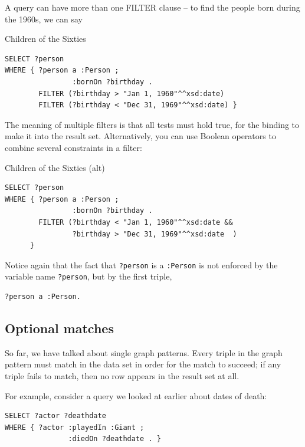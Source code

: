 A query can have more than one FILTER clause -- to find the people born
during the 1960s, we can say

\begin{query}Children of the Sixties\end{query}
\begin{lstlisting}
SELECT ?person
WHERE { ?person a :Person ;
                :bornOn ?birthday .
        FILTER (?birthday > "Jan 1, 1960"^^xsd:date)
        FILTER (?birthday < "Dec 31, 1969"^^xsd:date) }
\end{lstlisting}


The meaning of multiple filters is that all tests must hold true, for
the binding to make it into the result set. Alternatively, you can use
Boolean operators to combine several constraints in a filter:

\begin{query}Children of the Sixties (alt)\end{query}
\begin{lstlisting}
SELECT ?person
WHERE { ?person a :Person ;
                :bornOn ?birthday .
        FILTER (?birthday < "Jan 1, 1960"^^xsd:date &&
                ?birthday > "Dec 31, 1969"^^xsd:date  )
      }
\end{lstlisting}

Notice again that the fact that \texttt{?person} is a \texttt{:Person} is not enforced by
the variable name \texttt{?person}, but by the first triple,

\begin{lstlisting}
?person a :Person.
\end{lstlisting}

\subsection{Optional matches}

So far, we have talked about single graph patterns. Every triple in the
graph pattern must match in the data set in order for the match to
succeed; if any triple fails to match, then no row appears in the result
set at all.

For example, consider a query we looked at earlier about dates of death:



\begin{lstlisting}
SELECT ?actor ?deathdate
WHERE { ?actor :playedIn :Giant ;
               :diedOn ?deathdate . }
\end{lstlisting}

